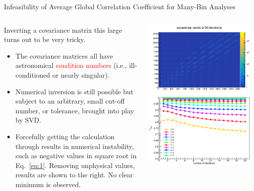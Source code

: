 \documentclass[aspectratio=169]{beamer}
\begin{document}
\begin{frame}{Infeasibility of Average Global Correlation Coefficient for Many-Bin Analyses}
  \begin{columns}
    \begin{column}{.65\textwidth}
    Inverting a covariance matrix this large turns out to be very tricky.
    \begin{itemize}
      \item The covariance matrices all have astronomical \textcolor{red}{condition numbers} (i.e., ill-conditioned or nearly singular).
      \item Numerical inversion is still possible but subject to an arbitrary, small cut-off number, or tolerance, brought into play by SVD.
      \item Forcefully getting the calculation through results in numerical instability, such as negative values in square root in Eq.~\ref{eq:1}. Removing unphysical values, results are shown to the right. No clear minimum is observed.
    \end{itemize}
    \end{column}
    \begin{column}{.35\textwidth}
      \includegraphics[width=\textwidth]{figures/cov_mat_iter20.png} \\
      \includegraphics[width=\textwidth]{figures/avg_rho.eps}
    \end{column}
  \end{columns}
\end{frame}
\end{document}
